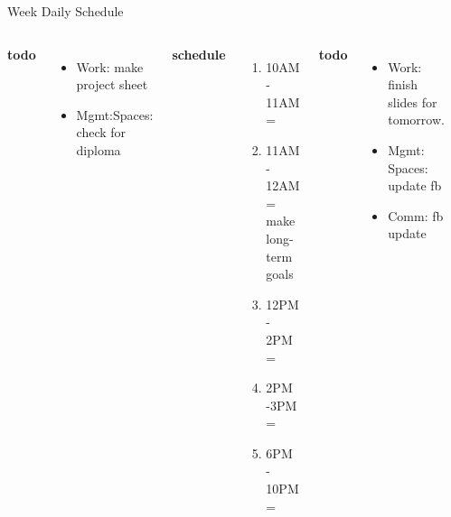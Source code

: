 \begin{frame}
\begin{columns}
\begin{column}{0.50\linewidth}
\begin{block}{Week Daily Schedule}
{\begin{columns}
          \textbf{\small todo} \\
          \begin{itemize}
            \tiny \item \tiny Work: make project sheet  
          \item \tiny Mgmt:Spaces: check for diploma  
          \end{itemize}  
          \textbf{\small schedule} 
          \begin{enumerate}
            \tiny \item \tiny 10AM - 11AM = 
          \item \tiny 11AM - 12AM = make long-term goals 
          \item \tiny 12PM - 2PM = 
            \tiny \item \tiny 2PM -3PM = 
          \item \tiny 6PM - 10PM = 
          \end{enumerate}  
          
          \textbf{\small todo} \\
          \begin{itemize}
           \tiny \item \tiny Work: finish slides for tomorrow. 
           \item \tiny Mgmt: Spaces: update fb 
         \item \tiny Comm: fb update 
          \end{itemize}
          \textbf{\small schedule} \\
          \begin{enumerate}
            \tiny \item \tiny 8-9AM: Regular Routines 
          \item \tiny 9AM - 10AM: Send message 
            \item \tiny 6:30PM - 7:30PM = 
          \end{enumerate} 
          \textbf{\small todo}\\
          \begin{itemize}  
            \tiny \item \tiny 
          \item \tiny 
          \end{itemize} 


\end{columns}}
\end{block}
\end{column}
\end{columns}
\end{frame}
